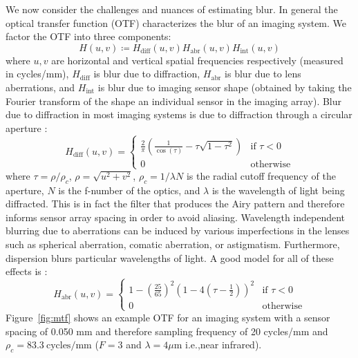 We now consider the challenges and nuances of estimating blur.
%
In general the optical transfer function (OTF) characterizes the blur of an imaging system.
%
We factor the OTF into three components:
\begin{equation}
	H(u, v) \coloneqq H_{\text{diff}}(u,v) H_{\text{abr}}(u,v) H_{\text{int}} (u,v)
\end{equation}
where \(u,v\) are horizontal and vertical spatial frequencies respectively (measured in cycles/mm), \(H_{\text{diff}}\) is blur due to diffraction, \(H_{\text{abr}}\) is blur due to lens aberrations, and \(H_{\text{int}}\) is blur due to imaging sensor shape (obtained by taking the Fourier transform of the shape an individual sensor in the imaging array).
%
Blur due to diffraction in most imaging systems is due to diffraction through a circular aperture \cite{goodman2005introduction}:
\begin{equation*}
	H_{\text{diff}}(u,v) =   \begin{cases}
		\frac{2}{\pi} \left(\frac{1}{\cos(\tau)} - \tau \sqrt{1-\tau^2}\right) & \text{if } \tau < 0 \\
		0                                                                      & \text{otherwise}
	\end{cases}
\end{equation*}
where \(\tau = \rho/\rho_c\), \(\rho=\sqrt{u^2 +v^2}\), \(\rho_c = 1/\lambda N\) is the radial cutoff frequency of the aperture, \(N\) is the f-number of the optics, and \(\lambda\) is the wavelength of light being diffracted.
%
This is in fact the filter that produces the Airy pattern and therefore informs sensor array spacing in order to avoid aliasing.
%
Wavelength independent blurring due to aberrations can be induced by various imperfections in the lenses such as spherical aberration, comatic aberration, or astigmatism. Furthermore, dispersion blurs particular wavelengths of light. A good model for all of these effects is \cite{10.1117.12.946501}:
\begin{equation*}
	H_{\text{abr}}(u,v) =   \begin{cases}
		1-\left(\frac{25}{65}\right)^2 \left(1-4\left(\tau - \frac{1}{2}\right)\right)^2 & \text{if } \tau < 0 \\
		0                                                                                & \text{otherwise}
	\end{cases}
\end{equation*}
Figure~\ref{fig:mtf} shows an example OTF for an imaging system with a sensor spacing of 0.050 mm and therefore sampling frequency of 20 cycles/mm and \(\rho_c = 83.3~\text{cycles}/\text{mm}\) (\(F=3\) and \(\lambda = 4\mu\text{m}\) i.e.,near infrared).
